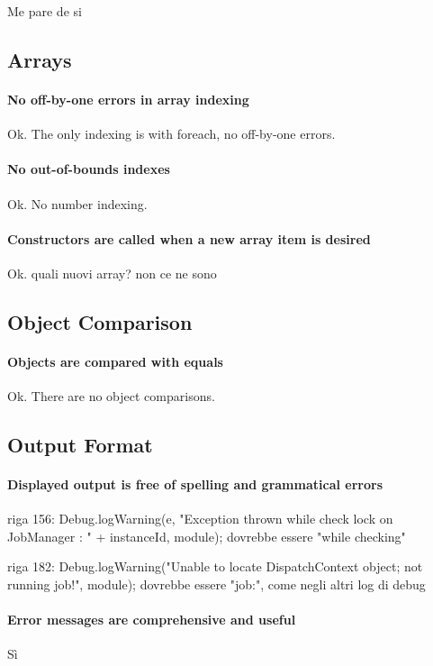 \documentclass[english]{article}
\begin{document}
Me pare de si


\subsection{Arrays}
\paragraph{No off-by-one errors in array indexing}
Ok.
The only indexing is with foreach, no off-by-one errors.

\paragraph{No out-of-bounds indexes}
Ok.
No number indexing.

\paragraph{Constructors are called when a new array item is desired}
Ok.
quali nuovi array? non ce ne sono

\subsection{Object Comparison}
\paragraph{Objects are compared with equals}
Ok.
There are no object comparisons.

\subsection{Output Format}
\paragraph{Displayed output is free of spelling and grammatical errors}
riga 156:
Debug.logWarning(e, "Exception thrown while check lock on JobManager : " + instanceId, module);
dovrebbe essere "while checking"

riga 182:
Debug.logWarning("Unable to locate DispatchContext object; not running job!", module);
dovrebbe essere "job:", come negli altri log di debug

\paragraph{Error messages are comprehensive and useful}
Sì
\end{document}
